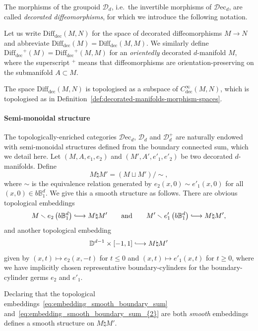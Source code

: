 \documentclass[AHL,Unicode,published]{cedram}
\newcommand{\rdec}{\mathrm{dec}}
\newcommand{\rec}{\mathrm{ec}}
\newcommand{\cD}{\mathcal{D}}
\newcommand{\bB}{\mathbb{B}}
\newcommand{\bD}{\mathbb{D}}
\newcommand{\longhookrightarrow}{\lhook\joinrel\longrightarrow}
\newcommand{\diffdec}{\ensuremath{\mathrm{Diff}_{\rdec}}}
\newcommand{\cdec}{\ensuremath{C^\infty_{\rdec}}}
\renewcommand{\geq}{\geqslant}
\renewcommand{\leq}{\leqslant}
\begin{document}
The morphisms of the groupoid $\cD_{d}$, i.e.~the invertible morphisms of $\cD\rec_d$, are called \emph{decorated diffeomorphisms}, for which we introduce the following notation.
\begin{nota}\label{not:diffdec}
Let us write $\diffdec(M,N)$ for the space of decorated diffeomorphisms $M \to N$ and abbreviate $\diffdec(M) = \diffdec(M,M)$. We similarly define $\diffdec^{+}(M) = \diffdec^{+}(M,M)$ for an \emph{orientedly} decorated $d$-manifold $M$, where the superscript ${}^{+}$ means that diffeomorphisms are orientation-preserving on the submanifold $A \subset M$.
\end{nota}

The space $\diffdec(M,N)$ is topologised as a subspace of $\cdec(M,N)$, which is topologised as in Definition~\ref{def:decorated-manifolds-morphism-spaces}.


\paragraph*{Semi-monoidal structure}
The topologically-enriched categories $\cD\rec_d$, $\cD_{d}$ and $\cD_{d}^{+}$ are naturally endowed with semi-monoidal structures defined from the boundary connected sum, which we detail here. Let $(M,A,e_{1},e_{2})$ and $(M',A',e'_{1},e'_{2})$ be two decorated $d$-manifolds. Define
\[
M \natural M' = (M \sqcup M')/{\sim},
\]
where $\sim$ is the equivalence relation generated by $e_{2}(x,0) \sim e'_{1}(x,0)$ for all $(x,0) \in b\bB^d_{1}$. We give this a smooth structure as follows. There are obvious topological embeddings
\begin{equation}\label{eq:embedding_smooth_boundary_sum}
M \smallsetminus e_{2}\left(b\bB^d_{1}\right) \longhookrightarrow M \natural M' \qquad\text{and}\qquad M' \smallsetminus e'_{1}\left(b\bB^d_{1}\right) \longhookrightarrow M \natural M',
\end{equation}
and another topological embedding
\begin{equation}\label{eq:embedding_smooth_boundary_sum_{2}}
\bD^{d-1} \times [-1,1] \longhookrightarrow M \natural M'
\end{equation}
given by $(x,t) \mapsto e_{2}(x,-t)$ for $t \leq 0$ and $(x,t) \mapsto e'_{1}(x,t)$ for $t \geq 0$, where we have implicitly chosen representative boundary-cylinders for the boundary-cylinder germs $e_{2}$ and $e'_{1}$.

\begin{lemm}\label{lem:boundary_connected_sum}
Declaring that the topological embeddings~\eqref{eq:embedding_smooth_boundary_sum} and~\eqref{eq:embedding_smooth_boundary_sum_{2}} are both \emph{smooth} embeddings defines a smooth structure on $M \natural M'$.
\end{lemm}
\end{document}
